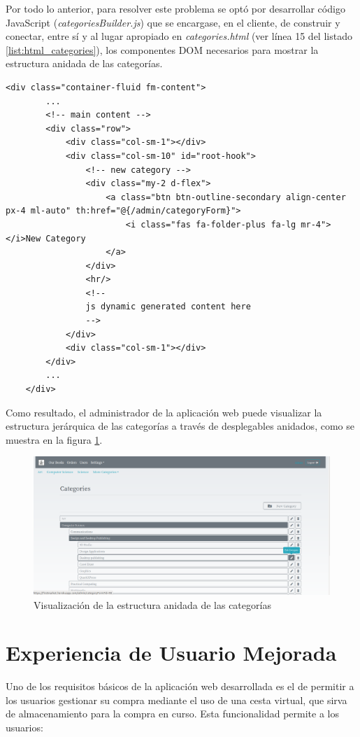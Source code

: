 \documentclass[a4paper,12pt,twoside,openright]{report}
\begin{document}
    Por todo lo anterior, para resolver este problema se optó por desarrollar código JavaScript (\emph{categoriesBuilder.js}) que se encargase, en el cliente, de construir y conectar, entre sí y al lugar apropiado en \emph{categories.html} (ver línea 15 del listado \ref{list:html_categories}), los componentes DOM necesarios para mostrar la estructura anidada de las categorías.
    \\
    
    \begin{lstlisting}[caption=Contenido principal de la vista categories.html,label=list:html_categories]
    <div class="container-fluid fm-content">
	    ...
	    <!-- main content -->
	    <div class="row">
		    <div class="col-sm-1"></div>
		    <div class="col-sm-10" id="root-hook">
			    <!-- new category -->
			    <div class="my-2 d-flex">
				    <a class="btn btn-outline-secondary align-center px-4 ml-auto" th:href="@{/admin/categoryForm}">
				    	<i class="fas fa-folder-plus fa-lg mr-4"></i>New Category
				    </a>
			    </div>
			    <hr/>
			    <!--
			    js dynamic generated content here
			    -->
		    </div>
		    <div class="col-sm-1"></div>
	    </div>
	    ...
    </div>
    \end{lstlisting}
    
    Como resultado, el administrador de la aplicación web puede visualizar la estructura jerárquica de las categorías a través de desplegables anidados, como se muestra en la figura \ref{fig:nested_categories}.
    
    \begin{figure}[htb!]
    	\centering
    	\includegraphics[width=\textwidth]{nested_categories}
    	\caption{Visualización de la estructura anidada de las categorías}
    	\label{fig:nested_categories}
    \end{figure}
    
    \section{Experiencia de Usuario Mejorada}
    Uno de los requisitos básicos de la aplicación web desarrollada es el de permitir a los usuarios gestionar su compra mediante el uso de una cesta virtual, que sirva de almacenamiento para la compra en curso. Esta funcionalidad permite a los usuarios:
    
\end{document}
